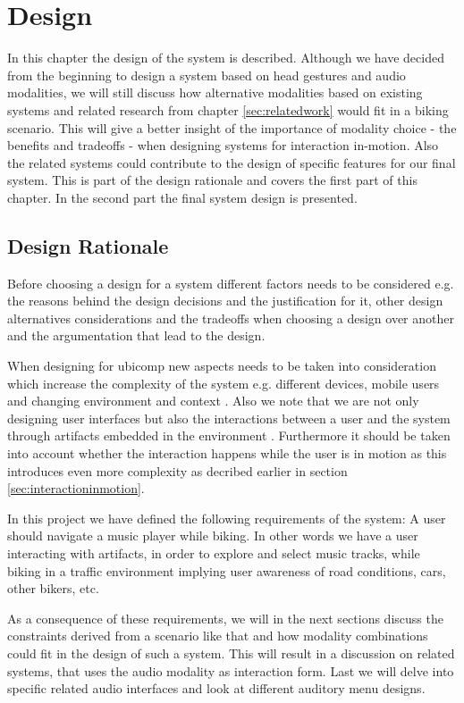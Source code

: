 \chapter{Design}
\label{sec:design}
In this chapter the design of the system is described. Although we have decided from the beginning to design a system based on head gestures and audio modalities, we will still discuss how alternative modalities based on existing systems and related research from chapter \ref{sec:relatedwork} would fit in a biking scenario. This will give a better insight of the importance of modality choice - the benefits and tradeoffs - when designing systems for interaction in-motion. Also the related systems could contribute to the design of specific features for our final system. This is part of the design rationale and covers the first part of this chapter. In the second part the final system design is presented.


\section{Design Rationale}
Before choosing a design for a system different factors needs to be considered e.g. the reasons behind the design decisions and the justification for it, other design alternatives considerations and the tradeoffs when choosing a design over another and the argumentation that lead to the design.

When designing for ubicomp new aspects needs to be taken into consideration which increase the complexity of the system e.g. different devices, mobile users and changing environment and context \cite{barfield_fundamentals_2000}. Also we note that we are not only designing user interfaces but also the interactions between a user and the system through artifacts embedded in the environment \cite{beaudouin-lafon_designing_2004}. Furthermore it should be taken into account whether the interaction happens while the user is in motion as this introduces even more complexity as decribed earlier in section \ref{sec:interactioninmotion}.

In this project we have defined the following requirements of the system: A user should navigate a music player while biking. In other words we have a user interacting with artifacts, in order to explore and select music tracks, while biking in a traffic environment implying user awareness of road conditions, cars, other bikers, etc.

As a consequence of these requirements, we will in the next sections discuss the constraints derived from a scenario like that and how modality combinations could fit in the design of such a system. This will result in a discussion on related systems, that uses the audio modality as interaction form. Last we will delve into specific related audio interfaces and look at different auditory menu designs.

